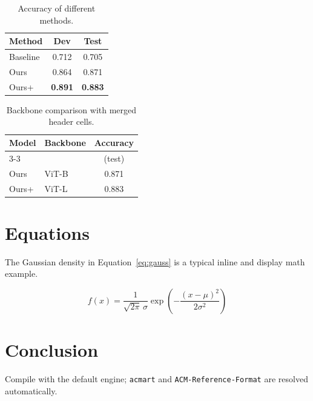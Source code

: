 \documentclass[sigconf]{acmart}
\begin{document}
\begin{table}[t]
  \caption{Accuracy of different methods.}
  \label{tab:main}
  \centering
  \begin{tabular}{lcc}
    \toprule
    Method & Dev & Test \\
    \midrule
    Baseline & 0.712 & 0.705 \\
    Ours     & 0.864 & 0.871 \\
    Ours+    & \textbf{0.891} & \textbf{0.883} \\
    \bottomrule
  \end{tabular}
\end{table}

\begin{table}[t]
  \caption{Backbone comparison with merged header cells.}
  \label{tab:merged}
  \centering
  \begin{tabular}{llc}
    \toprule
    \multirow{2}{*}{Model} & \multirow{2}{*}{Backbone} & Accuracy \\
    \cmidrule(l){3-3}
     & & (test) \\
    \midrule
    Ours  & ViT-B & 0.871 \\
    Ours+ & ViT-L & 0.883 \\
    \bottomrule
  \end{tabular}
\end{table}

\section{Equations}
The Gaussian density in Equation~\eqref{eq:gauss} is a typical inline
and display math example.

\begin{equation}
  f(x)=\frac{1}{\sqrt{2\pi}\,\sigma}
  \exp\!\left(-\frac{(x-\mu)^2}{2\sigma^2}\right)
  \label{eq:gauss}
\end{equation}

\section{Conclusion}
Compile with the default engine; \texttt{acmart} and
\texttt{ACM-Reference-Format} are resolved automatically.



\end{document}
